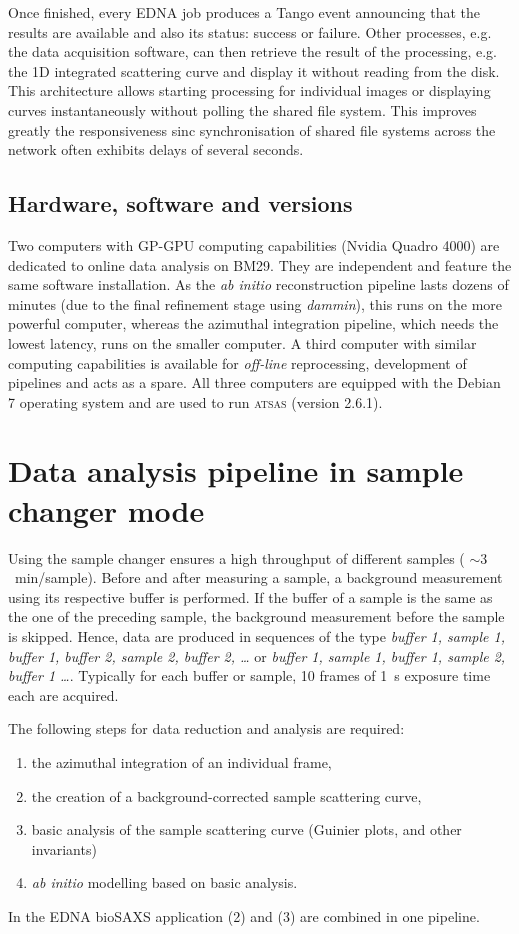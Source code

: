 \documentclass[preprint,pdf]{iucr}              %
\begin{document}
Once finished, every EDNA job produces  a Tango event announcing that the
results are available and also its status: success or failure.
Other processes, e.g. the data acquisition software, can then retrieve the result
of the processing, e.g. the 1D integrated scattering curve and
display it without reading from the disk.
This architecture allows starting processing for individual images or
displaying curves instantaneously without polling the shared file system.
This improves greatly the responsiveness sinc synchronisation of shared
file systems across the network often exhibits delays of several
seconds.

\subsection{Hardware, software and versions}
Two computers with GP-GPU computing capabilities (Nvidia Quadro 4000) are
dedicated to online data analysis on BM29. 
They are independent and feature the same software installation.
As the \textit{ab initio} reconstruction pipeline lasts dozens of minutes
(due to the final refinement stage using \textit{dammin}), this runs on the
more powerful computer, whereas the azimuthal integration pipeline, which needs
the lowest latency, runs on the smaller computer.
A third computer with similar computing capabilities is available for
\textit{off-line} reprocessing, development of pipelines and acts as a spare.
All three computers are equipped with the Debian 7 operating system and are
used to run \textsc{atsas} (version 2.6.1).



\section{Data analysis pipeline in sample changer mode}

Using the sample changer ensures a high throughput of different samples (
$\sim 3$~min/sample).
Before and after measuring a sample, a background measurement using its
respective buffer is performed.
If the buffer of a sample is the same as the one of the preceding sample, the
background measurement before the sample is skipped.
Hence, data are produced in sequences of the type \textit{buffer 1, sample 1,
buffer 1, buffer 2, sample 2, buffer 2, \ldots}  or  \textit{buffer 1, sample 1,
buffer 1,  sample 2, buffer 1 \ldots}.
Typically for each buffer or sample, 10 frames of 1~s exposure time each are
acquired.

The following steps for data reduction and analysis are required:
\begin{enumerate}
\item the azimuthal integration of an individual frame,
\item the creation of a background-corrected sample scattering curve,
\item basic analysis of the sample scattering curve (Guinier plots, and other
invariants)
\item \textit{ab initio} modelling based on basic analysis.
\end{enumerate}
In the EDNA bioSAXS application (2) and (3) are combined in one pipeline.
\end{document}
